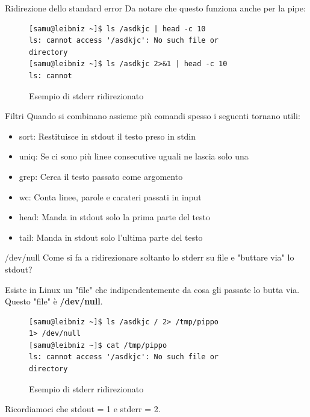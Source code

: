 \documentclass{beamer}
\begin{document}
\begin{frame}[fragile]{Ridirezione dello standard error}
  Da notare che questo funziona anche per la pipe:
  \begin{figure}
    \begin{lstlisting}
[samu@leibniz ~]$ ls /asdkjc | head -c 10
ls: cannot access '/asdkjc': No such file or 
directory
[samu@leibniz ~]$ ls /asdkjc 2>&1 | head -c 10
ls: cannot
    \end{lstlisting}
    \caption{Esempio di stderr ridirezionato}
  \end{figure}
\end{frame}

\begin{frame}{Filtri}
  Quando si combinano assieme più comandi spesso i seguenti tornano utili:
  \begin{itemize}
    \item<1-> sort: Restituisce in stdout il testo preso in stdin
    \item<2-> uniq: Se ci sono più linee consecutive uguali ne lascia solo una
    \item<3-> grep: Cerca il testo passato come argomento
    \item<4-> wc: Conta linee, parole e carateri passati in input
    \item<5-> head: Manda in stdout solo la prima parte del testo
    \item<6-> tail: Manda in stdout solo l'ultima parte del testo
  \end{itemize}
\end{frame}

\begin{frame}[fragile]{/dev/null}
  Come si fa a ridirezionare soltanto lo stderr su file e "buttare via" lo
  stdout? \medskip
  \pause

  Esiste in Linux un "file" che indipendentemente da cosa gli passate lo butta 
  via. Questo "file" è \textbf{/dev/null}.\medskip

  \begin{figure}
    \begin{lstlisting}
[samu@leibniz ~]$ ls /asdkjc / 2> /tmp/pippo 
1> /dev/null
[samu@leibniz ~]$ cat /tmp/pippo
ls: cannot access '/asdkjc': No such file or 
directory
    \end{lstlisting}
    \caption{Esempio di stderr ridirezionato}
  \end{figure}

Ricordiamoci che stdout = 1 e stderr = 2.
\end{frame}
\end{document}
